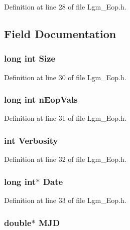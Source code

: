 Definition at line 28 of file Lgm\_\-Eop.h.

\subsection{Field Documentation}
\hypertarget{struct_lgm___eop_df3e4152cca72754e6f609e8b6804815}{
\subsubsection[{Size}]{\setlength{\rightskip}{0pt plus 5cm}long int {\bf Size}}}
\label{struct_lgm___eop_df3e4152cca72754e6f609e8b6804815}




Definition at line 30 of file Lgm\_\-Eop.h.\hypertarget{struct_lgm___eop_09c8bc9f75b8c57858e440f78d54e1ed}{
\subsubsection[{nEopVals}]{\setlength{\rightskip}{0pt plus 5cm}long int {\bf nEopVals}}}
\label{struct_lgm___eop_09c8bc9f75b8c57858e440f78d54e1ed}




Definition at line 31 of file Lgm\_\-Eop.h.\hypertarget{struct_lgm___eop_b00944552a5ef41ef0c18de744dd8207}{
\subsubsection[{Verbosity}]{\setlength{\rightskip}{0pt plus 5cm}int {\bf Verbosity}}}
\label{struct_lgm___eop_b00944552a5ef41ef0c18de744dd8207}




Definition at line 32 of file Lgm\_\-Eop.h.\hypertarget{struct_lgm___eop_8883a8c4c898cf0f1a1975081bc3974d}{
\subsubsection[{Date}]{\setlength{\rightskip}{0pt plus 5cm}long int$\ast$ {\bf Date}}}
\label{struct_lgm___eop_8883a8c4c898cf0f1a1975081bc3974d}




Definition at line 33 of file Lgm\_\-Eop.h.\hypertarget{struct_lgm___eop_fc3345d3a68ac61c1f7f989d70fbfd49}{
\subsubsection[{MJD}]{\setlength{\rightskip}{0pt plus 5cm}double$\ast$ {\bf MJD}}}
\label{struct_lgm___eop_fc3345d3a68ac61c1f7f989d70fbfd49}




